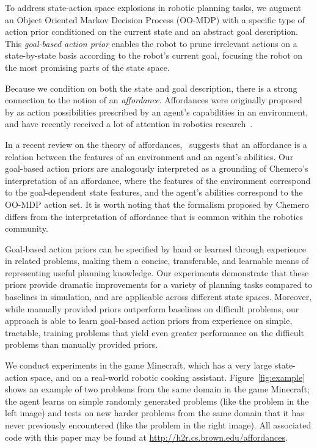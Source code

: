 \documentclass[letterpaper]{article}
\begin{document}
To address state-action space explosions in robotic planning tasks,
we augment an Object Oriented Markov Decision Process (OO-MDP) with a
specific type of action prior conditioned on the current state and an abstract goal description. This {\it goal-based action prior}
enables the robot to prune irrelevant actions on a
state-by-state basis according to the robot's current goal, focusing the robot on
the most promising parts of the state space.  

Because we condition on
both the state and goal description, there is a strong connection to the notion of an {\em affordance}.
Affordances were originally proposed by \citet{gibson77} as action possibilities
prescribed by an agent's capabilities in an environment, and have recently
received a lot of attention in robotics research~\citet{koppula13a,pas13,koppula13c}.

In a recent review on the theory of affordances,~\citet{chemero2003}
suggests that an affordance is a relation between the features of an
environment and an agent's abilities. Our goal-based action priors are
analogously interpreted as a grounding of Chemero's interpretation of an affordance,
where the features of the environment correspond to
the goal-dependent state features, and the agent's abilities
correspond to the OO-MDP action set. It is worth noting that the formalism
proposed by Chemero differs from the interpretation of affordance that is
common within the robotics community.
 
Goal-based action priors can be specified
by hand or learned through experience in related
problems, making them a concise, transferable, and learnable means of
representing useful planning knowledge. Our experiments demonstrate
that these priors provide dramatic improvements for a variety of
planning tasks compared to baselines in simulation, and are applicable
across different state spaces.  Moreover, while manually provided
priors outperform baselines on difficult problems, our approach
is able to learn goal-based action priors from experience on simple, tractable, 
training problems that yield even greater performance on the difficult problems
than manually provided priors.

We conduct experiments in
the game Minecraft, which has a very large state-action space, and on
a real-world robotic cooking assistant.  Figure~\ref{fig:example}
shows an example of two problems from the same domain in the game
Minecraft; the agent learns on simple randomly generated problems
(like the problem in the left image) and tests
on new harder problems from the same domain that it has never previously
encountered (like the problem in the right image).  All associated code with this paper may be found at
\url{http://h2r.cs.brown.edu/affordances}.  
\end{document}
